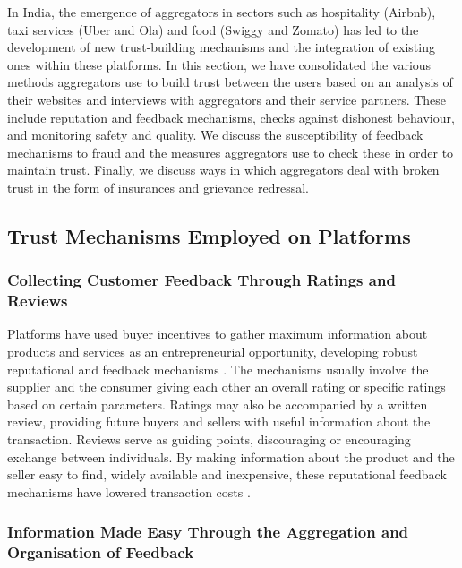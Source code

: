 \documentclass[a4paper, 12pt]{article}
\begin{document}
                    In India, the emergence of aggregators in sectors such as hospitality (Airbnb), taxi services (Uber and Ola) and food (Swiggy and Zomato) has led to the development of new trust-building mechanisms and the integration of existing ones within these platforms. In this section, we have consolidated the various methods aggregators use to build trust between the users based on an analysis of their websites and interviews with aggregators and their service partners. These include reputation and feedback mechanisms, checks against dishonest behaviour, and monitoring safety and quality. We discuss the susceptibility of feedback mechanisms to fraud and the measures aggregators use to check these in order to maintain trust. Finally, we discuss ways in which aggregators deal with broken trust in the form of insurances and grievance redressal.
                    
                    \newpage
                    
                    \subsection{Trust Mechanisms Employed on Platforms }
\subsubsection{Collecting Customer Feedback Through Ratings and Reviews}
                    
          Platforms have used buyer incentives to gather maximum information about products and services as an entrepreneurial opportunity, developing robust reputational and feedback mechanisms \parencite{thierer2015internet}. The mechanisms usually involve the supplier and the consumer giving each other an overall rating or specific ratings based on certain parameters. Ratings may also be accompanied by a written review, providing future buyers and sellers with useful information about the transaction. Reviews serve as guiding points, discouraging or encouraging exchange between individuals. By making information about the product and the seller easy to find, widely available and inexpensive, these reputational feedback mechanisms have lowered transaction costs \parencite{EYreport}.

\subsubsection{Information Made Easy Through the Aggregation and Organisation of Feedback}
                    
\end{document}
